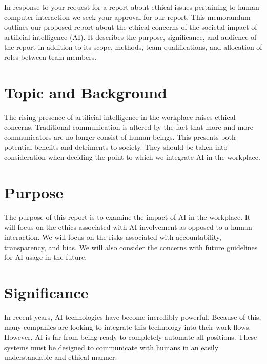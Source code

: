 \documentclass[letterpaper,11pt]{memo} %
\begin{document}
\maketitle %

In response to your request for a report about ethical issues pertaining to human-computer interaction we seek your approval for our report. %
This memorandum outlines our proposed report about the ethical concerns of the societal impact of artificial intelligence (AI).
It describes the purpose, significance, and audience of the report in addition to its scope, methods, team qualifications, and allocation of roles between team members. 

\section{Topic and Background}
The rising presence of artificial intelligence in the workplace raises ethical concerns. 
Traditional communication is altered by the fact that more and more communicators are no longer consist of  human beings. 
This presents both potential benefits and detriments to society. 
They should be taken into consideration when deciding the point to which we integrate AI in the workplace. 

\section{Purpose}
The purpose of this report is to  examine the impact of AI in the workplace.  
It will focus on the ethics associated with AI involvement as opposed to a human interaction.
We will focus on the risks associated with accountability, transparency, and bias.
We will also consider the concerns with future guidelines for AI usage in  the future. 

\section{Significance}
In recent years, AI technologies have become incredibly powerful. 
Because of this, many companies are looking to integrate this technology into their work-flows. 
However, AI is far from being ready to completely automate all positions. 
These systems must be designed to communicate with humans in an easily understandable and ethical manner.
\pagebreak
\end{document}

